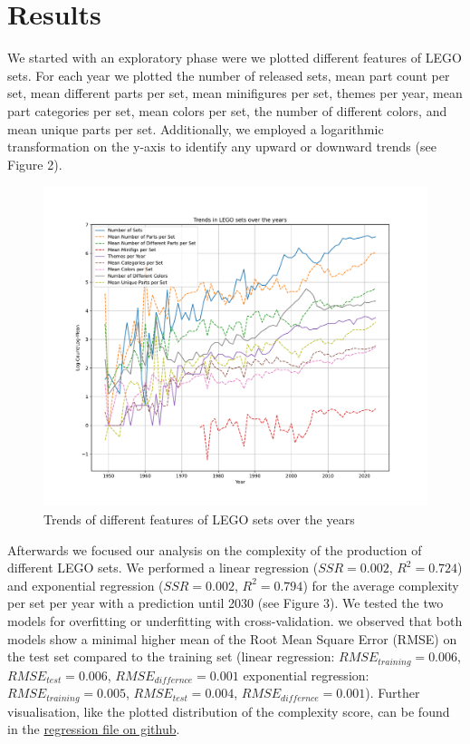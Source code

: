 \documentclass{article}
\theoremstyle{plain}
\theoremstyle{definition}
\theoremstyle{remark}
\begin{document}
\section{Results}\label{sec:results}
We started with an exploratory phase were we plotted different features of LEGO sets. For each year we plotted the number of released sets, mean part count per set, mean different parts per set, mean minifigures per set, themes per year, mean part categories per set, mean colors per set, the number of different colors, and mean unique parts per set. Additionally, we employed a logarithmic transformation on the y-axis to identify any  upward or downward trends (see Figure 2).

\begin{figure}[ht]
 \vskip 0.2in
 \begin{center}
 \centerline{\includegraphics[width=\columnwidth]{../Images/Exploration.pdf}}
\caption{Trends of different features of LEGO sets over the years}
\label{icml-historical}
 \end{center}
 \vskip -0.2in
\end{figure}

Afterwards we focused our analysis on the complexity of the production of different LEGO sets. We performed a linear regression ($SSR = 0.002$, $R^2= 0.724$) and exponential regression ($SSR = 0.002$, $R^2= 0.794$) for the average complexity per set per year with a prediction until 2030 (see Figure 3). We tested the two models for overfitting or underfitting with cross-validation. we observed that both models show a minimal higher mean of the Root Mean Square Error (RMSE) on the test set compared to the training set (linear regression: $RMSE_{training} = 0.006$, $RMSE_{test} = 0.006$, $RMSE_{differnce} = 0.001$ exponential regression: $RMSE_{training} = 0.005$, $RMSE_{test} = 0.004$, $RMSE_{differnce} = 0.001$). Further visualisation, like the plotted distribution of the complexity score, can be found in the \href{https://github.com/eddiebeach99/Data_Literacy/blob/main/Analysis/complexity_regression.ipynb}{regression file on github}.
\end{document}
